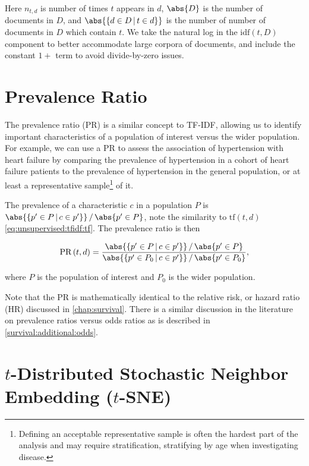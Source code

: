 \noindent Here $n_{t,d}$ is number of times $t$ appears in $d$,
$\abs{D}$ is the number of documents in $D$,
and $\abs{\left\{d \in D \, | \, t \in d\right\}}$ is the number of number of documents in $D$ which contain $t$.
We take the natural log in the $\text{idf}\left(t,D\right)$ component to better accommodate large corpora of documents,
and include the constant $1+$ term to avoid divide-by-zero issues.

\section{Prevalence Ratio}
\label{dim_reduct:prevalence_ratio}

The prevalence ratio (PR) is a similar concept to TF-IDF,
allowing us to identify important characteristics of a population of interest versus the wider population.
For example, we can use a PR to assess the association of hypertension with heart failure by comparing
the prevalence of hypertension in a cohort of heart failure patients
to the prevalence of hypertension in the general population,
or at least a representative sample\footnote{Defining an acceptable representative sample is often the hardest part of the analysis and may require stratification, \eg stratifying by age when investigating disease.} of it.

The prevalence of a characteristic $c$ in a population $P$ is $\abs{\{p' \in P \, | \, c \in p'\}} \, / \, \abs{p' \in P}$,
note the similarity to $\text{tf}\left(t,d\right)$ \cref{eq:unsupervised:tfidf:tf}.
The prevalence ratio is then

\begin{equation}\label{eq:unsupervised:PR}
\text{PR}\left(t,d\right) = \frac{ \abs{\{p' \in P \, | \, c \in p'\}} \, / \, \abs{p' \in P} }{ \abs{\{p' \in P_{0} \, | \, c \in p'\}} \, / \, \abs{p' \in P_{0}} },
\end{equation}

\noindent where $P$ is the population of interest and $P_{0}$ is the wider population.

Note that the PR is mathematically identical to the relative risk, or hazard ratio (HR) discussed in \cref{chap:survival}.
There is a similar discussion in the literature \cite{pmid27460748,10.3389/fvets.2017.00193}
on prevalence ratios versus odds ratios as is described in \cref{survival:additional:odds}.


\section{\texorpdfstring{$t$}{t}-Distributed Stochastic Neighbor Embedding (\texorpdfstring{$t$}{t}-SNE)}
\label{dim_reduct:tSNE}
